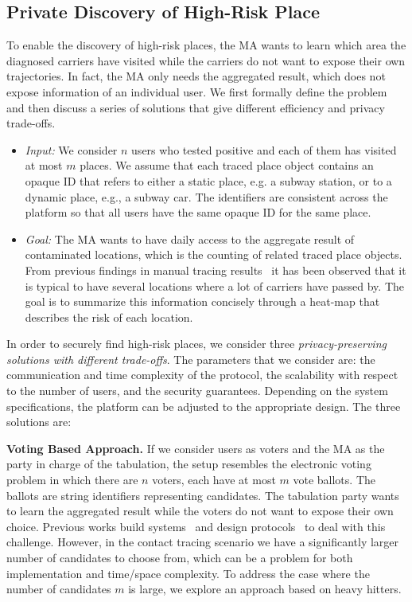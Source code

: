 \documentclass[11pt]{article}  %
\begin{document}
\subsection{Private Discovery of High-Risk Place}

To enable the discovery of high-risk places,  the MA wants to learn which area the diagnosed carriers have visited while the  carriers do not want to expose their own trajectories. In fact, the MA only needs the aggregated result, which does not expose information of an individual user. 
We first formally define the problem and then discuss a series of solutions that give different efficiency and privacy trade-offs.

\begin{itemize}
    \item \emph{Input:} We consider $n$ users who tested positive and each of them has visited at most $m$ places. We assume that each traced place object contains an opaque ID that refers to either a static place, e.g. a subway station, or to a dynamic place, e.g., a subway car. The identifiers are consistent across the platform so that all users have the same opaque ID for the same place.
    \item \emph{Goal:} The MA wants to have daily access to the aggregate result of contaminated locations, which is the counting of related traced place objects. From previous findings in manual tracing results~\cite{fishstore} it has been observed that it is typical to have several locations where a lot of carriers have passed by. The goal is to summarize this information concisely through a heat-map that describes the risk of each location.  %
\end{itemize}

In order to securely find high-risk places, we consider three \emph{privacy-preserving solutions with different trade-offs}.
The parameters that we consider are: the communication and time complexity of the protocol, the scalability with respect to the number of users, and the security guarantees. 
Depending on the system specifications, the platform can be adjusted to the appropriate design. 
The three solutions are:

\textbf{Voting Based Approach.} If we consider users as voters and the MA as the party in charge of the tabulation, the setup resembles the electronic voting problem in which there are $n$ voters, each have at most $m$ vote ballots. The ballots are string identifiers representing candidates. The tabulation party wants to learn the aggregated result while the voters do not want to expose their own choice. Previous works build systems~\cite{Karlof2005} and design protocols~\cite{Katz2001, Neff2004, Chaum2004} to deal with this challenge. However, in the contact tracing scenario we have a significantly larger number of candidates to choose from, which can be a problem for both implementation and time/space complexity. %
To address the case where the number of candidates $m$ is large, we explore an approach based on heavy hitters. 
\end{document}
